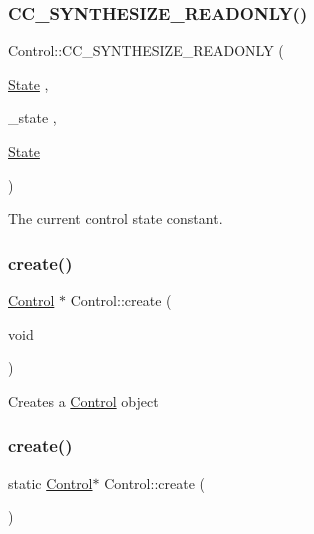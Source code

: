 \subsubsection{\texorpdfstring{C\+C\+\_\+\+S\+Y\+N\+T\+H\+E\+S\+I\+Z\+E\+\_\+\+R\+E\+A\+D\+O\+N\+L\+Y()}{CC\_SYNTHESIZE\_READONLY()}\hspace{0.1cm}{\footnotesize\ttfamily [2/2]}}
{\footnotesize\ttfamily Control\+::\+C\+C\+\_\+\+S\+Y\+N\+T\+H\+E\+S\+I\+Z\+E\+\_\+\+R\+E\+A\+D\+O\+N\+LY (\begin{DoxyParamCaption}\item[{\hyperlink{classControl_a89e9598cd785841ac91cff3c4798c469}{State}}]{,  }\item[{\+\_\+state}]{,  }\item[{\hyperlink{classControl_a89e9598cd785841ac91cff3c4798c469}{State}}]{ }\end{DoxyParamCaption})\hspace{0.3cm}{\ttfamily [protected]}}

The current control state constant. \mbox{\label{classControl_adeb76cd686f2524adbc38df9ad345c9f}} 
\subsubsection{\texorpdfstring{create()}{create()}\hspace{0.1cm}{\footnotesize\ttfamily [1/2]}}
{\footnotesize\ttfamily \hyperlink{classControl}{Control} $\ast$ Control\+::create (\begin{DoxyParamCaption}\item[{void}]{ }\end{DoxyParamCaption})\hspace{0.3cm}{\ttfamily [static]}}

Creates a \hyperlink{classControl}{Control} object \mbox{\label{classControl_ae8c17a434d15e570a1a3eb4900ee43e2}} 
\subsubsection{\texorpdfstring{create()}{create()}\hspace{0.1cm}{\footnotesize\ttfamily [2/2]}}
{\footnotesize\ttfamily static \hyperlink{classControl}{Control}$\ast$ Control\+::create (\begin{DoxyParamCaption}{ }\end{DoxyParamCaption})\hspace{0.3cm}{\ttfamily [static]}}

